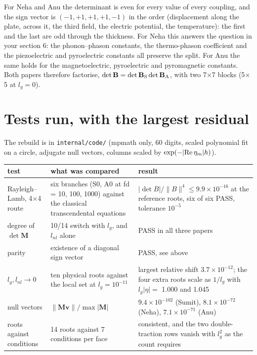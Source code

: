 \documentclass[11pt,a4paper]{article}
\begin{document}
For Neha and Anu the determinant is even for every value of every coupling, and the sign vector is
$(-1,+1,+1,+1,-1)$ in the order (displacement along the plate, across it, the third field, the electric
potential, the temperature): the first and the last are odd through the thickness. For Neha this answers the
question in your section 6: the phonon--phason constants, the thermo-phason coefficient and the
piezoelectric and pyroelectric constants all preserve the split. For Anu the same holds for the
magnetoelectric, pyroelectric and pyromagnetic constants. Both papers therefore factorise,
$\det\mathbf B=\det\mathbf B_{\rm S}\det\mathbf B_{\rm A}$, with two 7$\times$7 blocks (5$\times$5 at
$l_g=0$).

\section*{Tests run, with the largest residual}

The rebuild is in \texttt{internal/code/} (mpmath only, 60 digits, scaled polynomial fit on a circle,
adjugate null vectors, columns scaled by $\exp(-|{\rm Re}\,\eta_m|h)$).

\begin{center}\footnotesize
\begin{tabular}{p{4.6cm}p{4.9cm}p{5.4cm}}
\toprule
test & what was compared & result\\
\midrule
Rayleigh--Lamb, 4$\times$4 route & six branches (S0, A0 at fd = 10, 100, 1000) against the classical
transcendental equations & $|{\det B}|/\|B\|^4 \le 9.9\times10^{-16}$ at the reference roots, six of six
PASS, tolerance $10^{-5}$\\
degree of $\det\mathbf M$ & 10/14 switch with $l_g$, and $l_{nl}$ alone & PASS in all three papers\\
parity & existence of a diagonal sign vector & PASS, see above\\
$l_g,l_{nl}\to0$ & ten physical roots against the local set at $l_g=10^{-11}$ & largest relative shift
$3.7\times10^{-12}$; the four extra roots scale as $1/l_g$ with $l_g|\eta|=$ 1.000 and 1.045\\
null vectors & $\|\mathbf M\mathbf v\|/\max|\mathbf M|$ & $9.4\times10^{-102}$ (Sumit),
$8.1\times10^{-72}$ (Neha), $7.1\times10^{-71}$ (Anu)\\
roots against conditions & 14 roots against 7 conditions per face & consistent, and the two
double-traction rows vanish with $l_g^2$ as the count requires\\
\bottomrule
\end{tabular}
\end{center}
\end{document}

